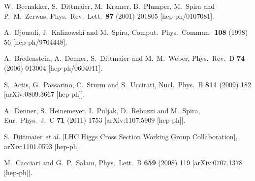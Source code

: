 \documentclass[preprintnumbers,superscriptaddress,nofootinbib,aps,prd,floatfix]{revtex4}
\begin{document}
\begin{thebibliography}{99}
  W.~Beenakker, S.~Dittmaier, M.~Kramer, B.~Plumper, M.~Spira and P.~M.~Zerwas,
  Phys.\ Rev.\ Lett.\  {\bf 87} (2001) 201805
  [hep-ph/0107081].
  
  A.~Djouadi, J.~Kalinowski and M.~Spira,
  Comput.\ Phys.\ Commun.\  {\bf 108} (1998) 56
  [hep-ph/9704448].
  
  A.~Bredenstein, A.~Denner, S.~Dittmaier and M.~M.~Weber,
  Phys.\ Rev.\ D {\bf 74} (2006) 013004
  [hep-ph/0604011].
  
  S.~Actis, G.~Passarino, C.~Sturm and S.~Uccirati,
  Nucl.\ Phys.\ B {\bf 811} (2009) 182
  [arXiv:0809.3667 [hep-ph]].
  
  A.~Denner, S.~Heinemeyer, I.~Puljak, D.~Rebuzzi and M.~Spira,
  Eur.\ Phys.\ J.\ C {\bf 71} (2011) 1753
  [arXiv:1107.5909 [hep-ph]].
  
  S.~Dittmaier {\it et al.}  [LHC Higgs Cross Section Working Group Collaboration],
  arXiv:1101.0593 [hep-ph].

  M.~Cacciari and G.~P.~Salam,
  Phys.\ Lett.\ B {\bf 659} (2008) 119
  [arXiv:0707.1378 [hep-ph]].


\end{thebibliography}
\end{document}
